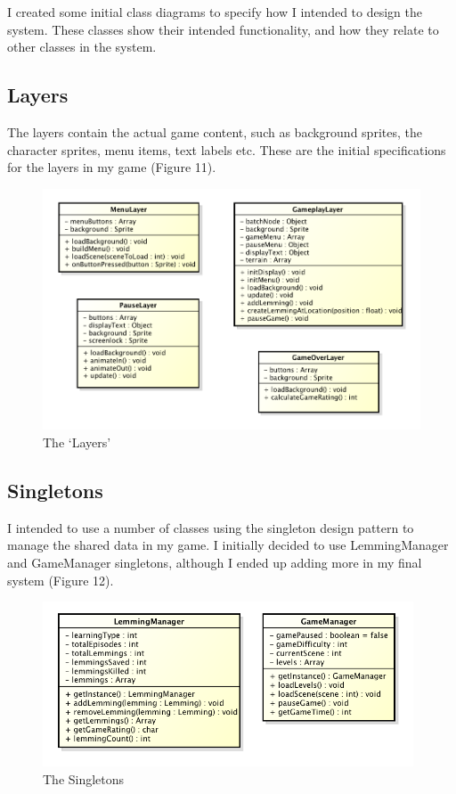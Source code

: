 \documentclass[a4paper,oneside]{report}
\begin{document}
I created some initial class diagrams to specify how I intended to design the system. These classes show their intended functionality, and how they relate to other classes in the system. 

\subsection{Layers}

The layers contain the actual game content, such as background sprites, the character sprites, menu items, text labels etc. These are the initial specifications for the layers in my game (Figure 11).

\begin{figure}[h!]
  \centering
    \includegraphics[width=130mm]{sources/images/Layers}
    \caption{The `Layers'}
\end{figure}

\subsection{Singletons}

I intended to use a number of classes using the singleton design pattern to manage the shared data in my game. I initially decided to use LemmingManager and GameManager singletons, although I ended up adding more in my final system (Figure 12).

\begin{figure}[h!]
  \centering
    \includegraphics[width=110mm]{sources/images/Singletons}
    \caption{The Singletons}
\end{figure}
\end{document}
